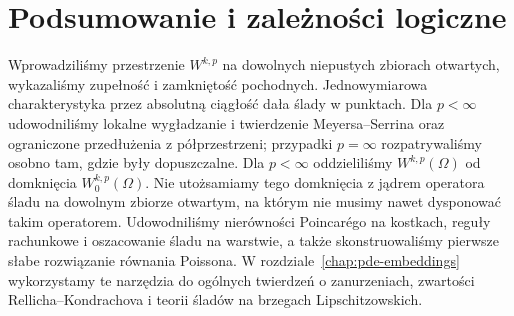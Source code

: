 \section{Podsumowanie i zależności logiczne}
Wprowadziliśmy przestrzenie $W^{k,p}$ na dowolnych
niepustych zbiorach otwartych, wykazaliśmy zupełność
i zamkniętość pochodnych. Jednowymiarowa charakterystyka
przez absolutną ciągłość dała ślady w punktach.
Dla $p<\infty$ udowodniliśmy lokalne wygładzanie
i twierdzenie Meyersa--Serrina oraz ograniczone
przedłużenia z półprzestrzeni; przypadki $p=\infty$
rozpatrywaliśmy osobno tam, gdzie były dopuszczalne.
Dla $p<\infty$ oddzieliliśmy $W^{k,p}(\Omega)$
od domknięcia $W^{k,p}_0(\Omega)$.
Nie utożsamiamy tego domknięcia z jądrem operatora
śladu na dowolnym zbiorze otwartym, na którym nie
musimy nawet dysponować takim operatorem.
Udowodniliśmy nierówności Poincarégo na kostkach,
reguły rachunkowe i oszacowanie śladu na warstwie,
a także skonstruowaliśmy pierwsze słabe rozwiązanie
równania Poissona. W rozdziale~\ref{chap:pde-embeddings}
wykorzystamy te narzędzia do ogólnych twierdzeń o
zanurzeniach, zwartości Rellicha--Kondrachova
i teorii śladów na brzegach Lipschitzowskich.


